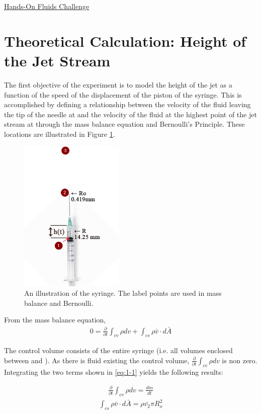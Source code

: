 \documentclass{article}
\newcommand*\circled[1]{\tikz[baseline=(char.base)]{
            \node[shape=circle,draw,inner sep=2pt] (char) {#1};}}
\begin{document}
\begin{center}\underline{\huge Hands-On Fluids Challenge}\end{center}

\section{Theoretical Calculation: Height of the Jet Stream}
%
The first objective of the experiment is to model the height of the jet as a function of the speed of the displacement of the piston of the syringe. This is accomplished by defining a relationship between the velocity of the fluid leaving the tip of the needle at \circled{2} and the velocity of the fluid at the highest point of the jet stream at \circled{3} through the mass balance equation and Bernoulli's Principle. These locations are illustrated in Figure \ref{fig:1}.

%
\begin{figure}[h!]
\centering
  \includegraphics[width=50mm]{Syringe.png}
  \captionsetup{justification=centering}
  \caption{An illustration of the syringe. The label points are used in mass balance and Bernoulli.}
  \label{fig:1}
\end{figure}
%
From the mass balance equation,
\begin{align*}
0= \frac{\partial}{\partial{t}} \int_{cv} \rho dv + \int_{cs} \rho \bar{v} \cdot d\bar{A} \label{eq:1-1} 
\end{align*} 

The control volume consists of the entire syringe (i.e. all volumes enclosed between \circled{1} and \circled{2}). As there is fluid existing the control volume, $\frac{\partial}{\partial{t}} \int_{cv} \rho dv$ is non zero. Integrating the two terms shown in \eqref{eq:1-1} yields the following results:

\begin{align*}
\frac{\partial}{\partial{t}} \int_{cv} \rho dv = \frac{dm}{dt}
\end{align*}
\begin{align*}
\int_{cs} \rho \bar{v} \cdot d\bar{A} = \rho \bar{v_2} \pi R_o^2
\end{align*}
\end{document}
